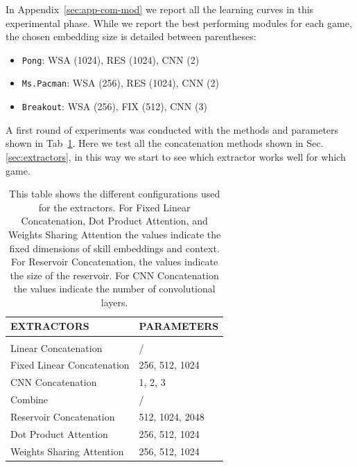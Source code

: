 In Appendix~\ref{sec:app-com-mod} we report all the learning curves in this experimental phase.
While we report the best performing modules for each game, the chosen embedding size is detailed between parentheses:
\begin{itemize}
    \item \texttt{Pong}: WSA (1024), RES (1024), CNN (2)
    \item \texttt{Ms.Pacman}: WSA (256), RES (1024), CNN (2)
    \item \texttt{Breakout}: WSA (256), FIX (512), CNN (3)
\end{itemize}





A first round of experiments was conducted with the methods and parameters shown in Tab~\ref{tab:firstround}.
Here we test all the concatenation methods shown in Sec. \ref{sec:extractors}, in this way we start to see which extractor works well for which game.
\begin{table}[htbp]
    \begin{center}
        \begin{tabular}{ll}
            \multicolumn{1}{l}{EXTRACTORS}  &\multicolumn{1}{l}{\bf PARAMETERS}
            \\ \hline \\
            Linear Concatenation              &  / \\
            Fixed Linear Concatenation        & 256, 512, 1024 \\
            CNN Concatenation                 & 1, 2, 3 \\
            Combine                           & / \\
            Reservoir Concatenation           & 512, 1024, 2048 \\
            Dot Product Attention             & 256, 512, 1024 \\
            Weights Sharing Attention         & 256, 512, 1024 \\

        \end{tabular}
    \end{center}
    \caption{This table shows the different configurations used for the extractors. For Fixed Linear Concatenation, Dot Product Attention, and Weights Sharing Attention the values indicate the fixed dimensions of skill embeddings and context. For Reservoir Concatenation, the values indicate the size of the reservoir. For CNN Concatenation the values indicate the number of convolutional layers.}
    \label{tab:firstround}
\end{table}


